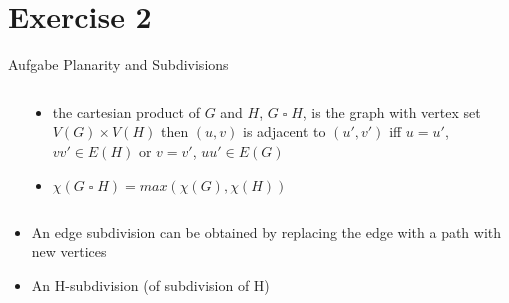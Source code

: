 
\section{Exercise 2}

\setcounter{exercise}{1}

\begin{frame}[allowframebreaks]{Aufgabe \thesection}{\small Planarity and Subdivisions}
  \begin{solution}
  \end{solution}
  \begin{requirementsnoinc}
    \begin{columns}
      \begin{column}{0.5\textwidth}
      \end{column}
      \begin{column}{0.5\textwidth}
        \begin{itemize}
        \item the cartesian product of $G$ and $H$, $G \operatorname{\square} H$, is the graph with vertex set $V(G) \times V(H)$ then $(u,v)$ is adjacent to $(u',v')$ \alert{iff} $u=u'$, $vv' \in E(H)$ or $v=v'$, $uu' \in E(G)$
          \item  $\chi(G \operatorname{\square} H) = max(\chi(G), \chi(H))$
        \end{itemize}
      \end{column}
    \end{columns}
  \end{requirementsnoinc}
  \begin{solution}
  \end{solution}
  \begin{requirements}
    \begin{itemize}
      \item An \alert{edge subdivision} can be obtained by replacing the edge with a path with new vertices
      \item An \alert{H-subdivision} (of subdivision of H)

\end{itemize}
\end{requirements}
\end{frame}
